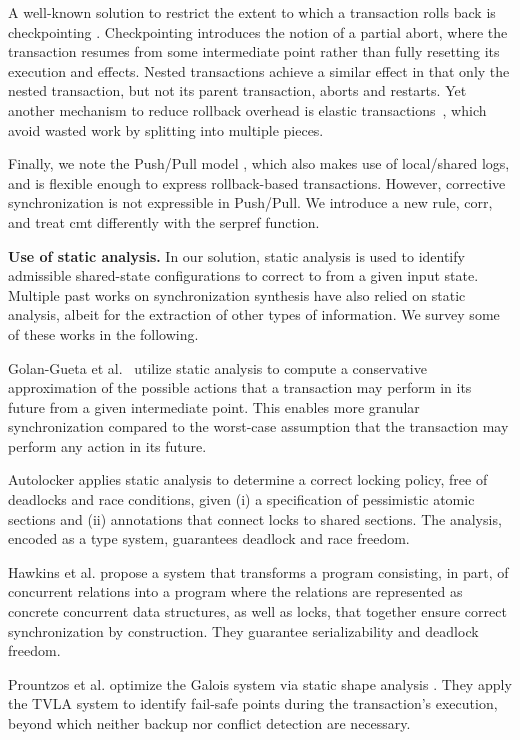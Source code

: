 A well-known solution to restrict the extent to which a transaction rolls back is checkpointing \cite{spaa08a,Egwutuoha:2013}. Checkpointing introduces the notion of a partial abort, where the transaction resumes from some intermediate point rather than fully resetting its execution and effects. Nested transactions \cite{ont,beeri} achieve a similar effect in that only the nested transaction, but not its parent transaction, aborts and restarts. Yet another mechanism to reduce rollback overhead is elastic transactions~\cite{FGG:DISC09}, which avoid wasted work by splitting into multiple pieces.  

Finally, we note the Push/Pull model \cite{KoskinenP15}, which also makes use of local/shared logs, and is flexible enough to express rollback-based transactions. However, corrective synchronization is not expressible in Push/Pull. We introduce a new rule, {\sf corr}, and treat {\sf cmt} differently with the {\sf serpref} function.

\noindent \textbf{Use of static analysis.} In our solution, static analysis is used to identify admissible shared-state configurations to correct to from a given input state. Multiple past works on synchronization synthesis have also relied on static analysis, albeit for the extraction of other types of information. We survey some of these works in the following.

Golan-Gueta et al.~\cite{GRSY:PLDI13} utilize static analysis to compute a conservative approximation of the possible actions that a transaction may perform in its future from a given intermediate point. This enables more granular synchronization compared to the worst-case assumption that the transaction may perform any action in its future.

Autolocker \cite{popl/McCloskeyZGB06} applies static analysis to determine a correct locking policy, free of deadlocks and race conditions, given (i) a specification of pessimistic atomic sections and (ii) annotations that connect locks to shared sections. The analysis, encoded as a type system, guarantees deadlock and race freedom.

Hawkins et al. \cite{HawkinsAFRS12} propose a system that transforms a program consisting, in part, of concurrent relations into a program where the relations are represented as concrete concurrent data structures, as well as locks, that together ensure correct synchronization by construction. They guarantee serializability and deadlock freedom.

Prountzos et al. \cite{PrountzosMPM11} optimize the Galois system \cite{Galois} via static shape analysis \cite{MoolyToplas}. They apply the TVLA system to identify fail-safe points during the transaction's execution, beyond which neither backup nor conflict detection are necessary. 





